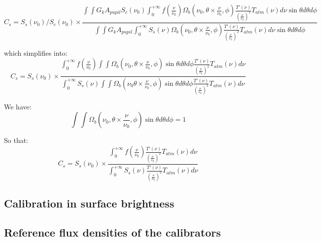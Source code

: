 \begin{equation}
C_{s} = S_{s}(\nu_{0}) / S_{c} (\nu_{0})  \times \frac{
  \int\int G_{k} A_{pupil} S_{c}(\nu_{0})\int_{0}^{+\infty} f(\frac{\nu}{\nu_{0}}) \Omega_{b}(\nu_{0}, \theta \times \frac{\nu}{\nu_{0}},
\phi) \frac{T'(\nu)}{\left(\frac{\nu}{\nu_{0}}\right)^{2}} 
T_{atm}(\nu) d\nu \sin \theta d\theta d\phi}
{\int \int G_{k}
A_{pupil} \int_{0}^{+\infty} S_{s}(\nu) \Omega_{b}(\nu_{0}, \theta \times \frac{\nu}{\nu_{0}},
\phi) \frac{T'(\nu)}{\left(\frac{\nu}{\nu_{0}}\right)^{2}} 
T_{atm}(\nu) d\nu \sin \theta d\theta d\phi
}
\end{equation}

which simplifies into:
\begin{equation}
C_{s} = S_{s}(\nu_{0})  \times \frac{
  \int_{0}^{+\infty} f(\frac{\nu}{\nu_{0}}) \int\int \Omega_{b}(\nu_{0}, \theta \times \frac{\nu}{\nu_{0}},
\phi)  \sin \theta d\theta d\phi \frac{T'(\nu)}{\left(\frac{\nu}{\nu_{0}}\right)^{2}} 
T_{atm}(\nu) d\nu}
{
\int_{0}^{+\infty} S_{s}(\nu) \int \int \Omega_{b}(\nu_{0} \theta \times \frac{\nu}{\nu_{0}},
\phi) \sin \theta  d\theta d\phi \frac{T'(\nu)}{\left(\frac{\nu}{\nu_{0}}\right)^{2}} 
T_{atm}(\nu) d\nu 
}
\end{equation}

We have:
\begin{equation}
\int\int \Omega_{b}(\nu_{0}, \theta \times \frac{\nu}{\nu_{0}},
\phi)  \sin \theta  d\theta d\phi = 1
\end{equation}

So that:
\begin{equation}
C_{s} = S_{s}(\nu_{0})  \times \frac{
  \int_{0}^{+\infty} f(\frac{\nu}{\nu_{0}}) \frac{T'(\nu)}{\left(\frac{\nu}{\nu_{0}}\right)^{2}} 
T_{atm}(\nu) d\nu}
{
\int_{0}^{+\infty} S_{s}(\nu)  \frac{T'(\nu)}{\left(\frac{\nu}{\nu_{0}}\right)^{2}} 
T_{atm}(\nu) d\nu 
}
\end{equation}



\subsection{Calibration in surface brightness}






 


\subsection{Reference flux densities of the calibrators}


